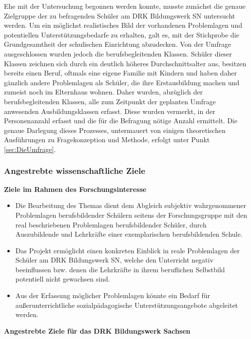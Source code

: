 Ehe mit der Untersuchung begonnen werden konnte, musste zunächst die genaue Zielgruppe der zu befragenden Schüler am DRK Bildungswerk SN untersucht werden. Um ein möglichst realistisches Bild der vorhandenen Problemlagen und potentiellen Unterstützungsbedarfe zu erhalten, galt es, mit der Stichprobe die Grundgesamtheit der schulischen Einrichtung abzudecken. Von der Umfrage ausgeschlossen wurden jedoch die berufsbegleitenden Klassen. Schüler dieser Klassen zeichnen sich durch ein deutlich höheres Durchschnittsalter aus, besitzen bereits einen Beruf, oftmals eine eigene Familie mit Kindern und haben daher gänzlich andere Problemlagen als Schüler, die ihre Erstausbildung machen und zumeist noch im Elternhaus wohnen. Daher wurden, abzüglich der berufsbegleitenden Klassen, alle zum Zeitpunkt der geplanten Umfrage anwesenden Ausbildungsklassen erfasst. Diese wurden vermerkt, in der Personenanzahl erfasst und die für die Befragung nötige Anzahl ermittelt. Die genaue Darlegung dieses Prozesses, untermauert von einigen theoretischen Ausführungen zu Fragekonzeption und Methode, erfolgt unter Punkt \ref{sec:DieUmfrage}. 

\subsubsection{Angestrebte wissenschaftliche Ziele}
\label{sec:AngestrebteWissenschaftlicheZiele}

\textbf{Ziele im Rahmen des Forschungsinteresse}

\begin{itemize}
	\item Die Bearbeitung des Themas dient dem Abgleich subjektiv wahrgenommener Problemlagen berufsbildender Schülern seitens der Forschungsgruppe mit den real beschriebenen Problemlagen berufsbildender Schüler, durch Auszubildende und Lehrkräfte einer exemplarischen berufsbildenden Schule.
	\item Das Projekt ermöglicht einen konkreten Einblick in reale Problemlagen der Schüler am DRK Bildungswerk SN, welche den Unterricht negativ beeinflussen bzw. denen die Lehrkräfte in ihrem beruflichen Selbstbild potentiell nicht gewachsen sind.
	\item Aus der Erfassung möglicher Problemlagen könnte ein Bedarf für außerunterrichtliche sozialpädagogische Unterstützungsangebote abgeleitet werden.
\end{itemize}

\noindent
\textbf{Angestrebte Ziele für das DRK Bildungswerk Sachsen}
 
